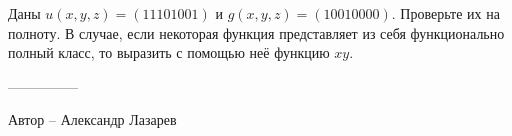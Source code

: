 \question
Даны $u(x, y, z) = (11101001)$ и $g(x, y, z) = (10010000)$. Проверьте их на полноту. В случае, если некоторая функция представляет из себя функционально полный класс, то выразить с помощью неё функцию $xy$.

---------------

Автор -- Александр Лазарев